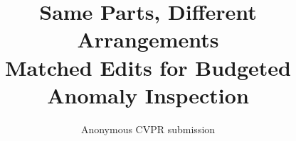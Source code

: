 \documentclass[10pt,twocolumn,letterpaper]{article}
\title{Same Parts, Different Arrangements\\Matched Edits for Budgeted Anomaly Inspection}
\author{Anonymous CVPR submission}
\begin{document}
\maketitle
    






{
    \small
    
    
}

%
\end{document}
